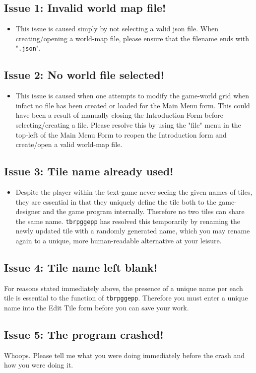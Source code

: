 \documentclass{article} \usepackage[margin=1in,headheight=57pt,headsep=0.1in]{geometry}
\begin{document}
\subsection{Issue 1: Invalid world map file!}
\begin{itemize}
	\item This issue is caused simply by not selecting a valid json file. When creating/opening a world-map file, please ensure that the filename ends with "\texttt{.json}".
\end{itemize}
\subsection{Issue 2: No world file selected!}
\begin{itemize}
	\item This issue is caused when one attempts to modify the game-world grid when infact no file has been created or loaded for the Main Menu form. This could have been a result of manually closing the Introduction Form before selecting/creating a file. Please resolve this by using the "file" menu in the top-left of the Main Menu Form to reopen the Introduction form and create/open a valid world-map file.
\end{itemize}
\subsection{Issue 3: Tile name already used!}
\begin{itemize}
	\item Despite the player within the text-game never seeing the given names of tiles, they are essential in that they uniquely define the tile both to the game-designer and the game program internally. Therefore no two tiles can share the same name. \texttt{tbrpggepp} has resolved this temporarily by renaming the newly updated tile with a randomly generated name, which you may rename again to a unique, more human-readable alternative at your leisure.
\end{itemize}
\subsection{Issue 4: Tile name left blank!}
For reasons stated immediately above, the presence of a unique name per each tile is essential to the function of \texttt{tbrpggepp}. Therefore you must enter a unique name into the Edit Tile form before you can save your work.
\subsection{Issue 5: The program crashed!}
Whoops. Please tell me what you were doing immediately before the crash and how you were doing it.
\end{document}
